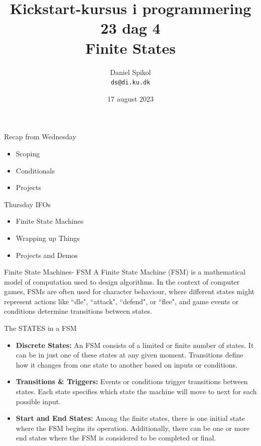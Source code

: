 \documentclass[10pt]{beamer}
\title[Kickstart-kursus] %
  {Kickstart-kursus i programmering 23 dag 4\\ Finite States} %
\author{\footnotesize{Daniel Spikol} \\
          \footnotesize{\texttt{ds@di.ku.dk}}}
\institute {DIKU \\ Københavns Universitet}
\date[17. august 2023]{17 august 2023}
\begin{document}
\begin{frame}[plain]
\titlepage
\end{frame}
\begin{frame}{Recap from Wednesday}
   	\begin{itemize}
	\item Scoping
	\item Conditionals
	\item Projects
	\end{itemize}
\end{frame}


\begin{frame}{Thursday IFOs}
  \begin{itemize}
  \item Finite State Machines
   \item Wrapping up Things
  \item Projects and Demos
  \end{itemize}
\end{frame}


\begin{frame}{Finite State Machines- FSM}
A Finite State Machine (FSM) is a mathematical model of computation used to design algorithms.
In the context of computer games, FSMs are often used for character behaviour, where different states might represent actions like ``dle", ``attack", ``defend", or ``flee", and game events or conditions determine transitions between states.

\end{frame}


\begin{frame}{The STATES in a FSM}
	\begin{itemize}
	\item \textbf{Discrete States:} An FSM consists of a limited or finite number of states. It can be in just one of these states at any given moment. Transitions define how it changes from one state to another based on inputs or conditions.
	\item \textbf{Transitions \& Triggers:} Events or conditions trigger transitions between states. Each state specifies which state the machine will move to next for each possible input.
	\item \textbf{Start and End States:} Among the finite states, there is one initial state where the FSM begins its operation. Additionally, there can be one or more end states where the FSM is considered to be completed or final.
	\end{itemize}
\end{frame}
\end{document}
